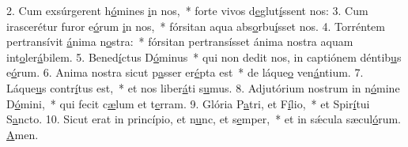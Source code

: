 2. Cum exsúrgerent h\uline{ó}mines \uline{i}n nos,~* forte vivos d\uline{e}glut\uline{í}ssent nos:
3. Cum irascerétur furor e\uline{ó}rum \uline{i}n nos,~* fórsitan aqua abs\uline{o}rbu\uline{í}sset nos.
4. Torréntem pertransívit \uline{á}nima n\uline{o}stra:~* fórsitan pertransísset ánima nostra aquam int\uline{o}ler\uline{á}bilem.
5. Bened\uline{í}ctus D\uline{ó}minus~* qui non dedit nos, in captiónem déntib\uline{u}s e\uline{ó}rum.
6. Anima nostra sicut p\uline{a}sser er\uline{é}pta est~* de láque\uline{o} ven\uline{á}ntium.
7. Láque\uline{u}s contr\uline{í}tus est,~* et nos liber\uline{á}ti s\uline{u}mus.
8. Adjutórium nostrum in n\uline{ó}mine D\uline{ó}mini,~* qui fecit c\uline{æ}lum et t\uline{e}rram.
9. Glória P\uline{a}tri, et F\uline{í}lio,~* et Spir\uline{í}tui S\uline{a}ncto.
10. Sicut erat in princípio, et n\uline{u}nc, et s\uline{e}mper,~* et in sǽcula sæcul\uline{ó}rum. \uline{A}men.
